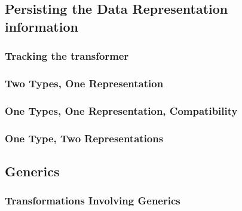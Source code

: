 
\subsection{Persisting the Data Representation information}



\subsubsection{Tracking the transformer}

\subsubsection{Two Types, One Representation}

\subsubsection{One Types, One Representation, Compatibility}

\subsubsection{One Type, Two Representations}

\subsection{Generics}

\subsubsection{Transformations Involving Generics}



